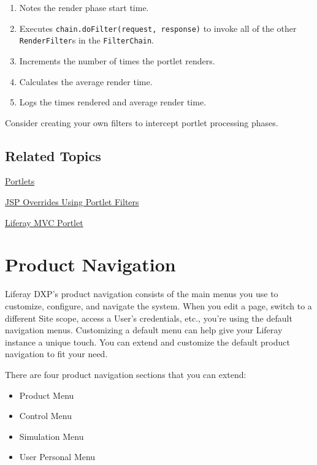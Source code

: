 \begin{enumerate}
\def\labelenumi{\arabic{enumi}.}
\item
  Notes the render phase start time.
\item
  Executes \texttt{chain.doFilter(request,\ response)} to invoke all of
  the other \texttt{RenderFilter}s in the \texttt{FilterChain}.
\item
  Increments the number of times the portlet renders.
\item
  Calculates the average render time.
\item
  Logs the times rendered and average render time.
\end{enumerate}

Consider creating your own filters to intercept portlet processing
phases.

\section{Related Topics}\label{related-topics-34}

\href{/docs/7-2/frameworks/-/knowledge_base/f/portlets}{Portlets}

\href{/docs/7-2/customization/-/knowledge_base/c/jsp-overrides-using-portlet-filters}{JSP
Overrides Using Portlet Filters}

\href{/docs/7-2/appdev/-/knowledge_base/a/liferay-mvc-portlet}{Liferay
MVC Portlet}

\chapter{Product Navigation}\label{product-navigation}

Liferay DXP's product navigation consists of the main menus you use to
customize, configure, and navigate the system. When you edit a page,
switch to a different Site scope, access a User's credentials, etc.,
you're using the default navigation menus. Customizing a default menu
can help give your Liferay instance a unique touch. You can extend and
customize the default product navigation to fit your need.

There are four product navigation sections that you can extend:

\begin{itemize}
\tightlist
\item
  Product Menu
\item
  Control Menu
\item
  Simulation Menu
\item
  User Personal Menu
\end{itemize}

